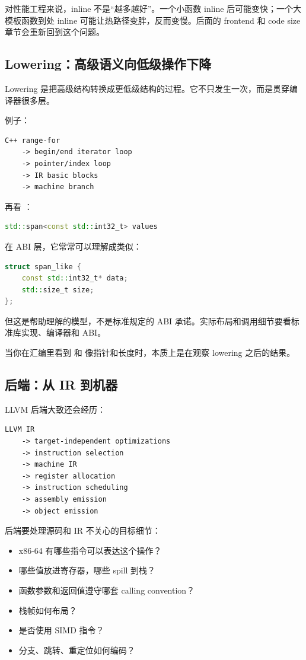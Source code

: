 对性能工程来说，inline 不是“越多越好”。一个小函数 inline 后可能变快；一个大模板函数到处 inline 可能让热路径变胖，反而变慢。后面的 frontend 和 code size 章节会重新回到这个问题。

\subsection{Lowering：高级语义向低级操作下降}

Lowering 是把高级结构转换成更低级结构的过程。它不只发生一次，而是贯穿编译器很多层。

例子：

\begin{lstlisting}
C++ range-for
    -> begin/end iterator loop
    -> pointer/index loop
    -> IR basic blocks
    -> machine branch
\end{lstlisting}

再看 ：

\begin{lstlisting}[language=C++]
std::span<const std::int32_t> values
\end{lstlisting}

在 ABI 层，它常常可以理解成类似：

\begin{lstlisting}[language=C++]
struct span_like {
    const std::int32_t* data;
    std::size_t size;
};
\end{lstlisting}

但这是帮助理解的模型，不是标准规定的 ABI 承诺。实际布局和调用细节要看标准库实现、编译器和 ABI。

当你在汇编里看到  和  像指针和长度时，本质上是在观察 lowering 之后的结果。

\subsection{后端：从 IR 到机器}

LLVM 后端大致还会经历：

\begin{lstlisting}
LLVM IR
    -> target-independent optimizations
    -> instruction selection
    -> machine IR
    -> register allocation
    -> instruction scheduling
    -> assembly emission
    -> object emission
\end{lstlisting}

后端要处理源码和 IR 不关心的目标细节：

\begin{itemize}
  \item x86-64 有哪些指令可以表达这个操作？
  \item 哪些值放进寄存器，哪些 spill 到栈？
  \item 函数参数和返回值遵守哪套 calling convention？
  \item 栈帧如何布局？
  \item 是否使用 SIMD 指令？
  \item 分支、跳转、重定位如何编码？
\end{itemize}

